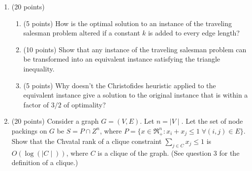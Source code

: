 \begin{enumerate}
   \item (20 points)
\begin{enumerate}
\item (5 points)
How is the optimal solution to an instance of the traveling
salesman problem altered if a constant $k$ is added to every edge length?
\item (10 points)
Show that any instance of the traveling salesman problem
can be transformed into an equivalent instance satisfying the
triangle inequality.
\item (5 points)
Why doesn't the Christofides heuristic applied to the equivalent
instance give a solution to the original instance that is within
a factor of $3/2$ of optimality?
\end{enumerate}
   \item (20 points)
          Consider a graph $G=(V,E)$. Let $n=\mid V \mid$.
          Let the set of node packings on $G$ be $S=P \cap Z^n$,
          where
           $P = \{x \in \Re_+^n : x_i + x_j \leq 1 \; \forall (i,j) \in E \}$.
          Show that the Chvatal rank of a clique constraint
          $\sum_{j \in C} x_j \leq 1$ is $O(\log(\mid C \mid))$,
          where $C$ is a clique of the graph.
          (See question 3 for the definition of a clique.)



\end{enumerate}
